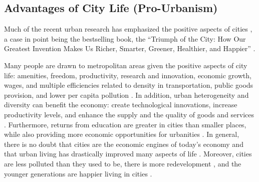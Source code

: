 \documentclass[11pt, letterpaper]{article}
\begin{document}
\begin{spacing}{1.4}
\subsection*{Advantages of City Life (Pro-Urbanism)}    
    
Much of the recent urban research has emphasized the positive aspects of cities \citep{thrift05,amin06,aokCityBook15,peck16}, a case in point being the bestselling book, the ``Triumph of the City: How Our Greatest Invention Makes Us Richer, Smarter, Greener, Healthier,
and Happier'' \citep{glaeser11}.

 
 Many people  are drawn to metropolitan areas  given the positive aspects of city life: amenities, freedom, productivity, research and innovation, economic growth, wages, and multiple efficiencies related to
density in transportation, public goods provision, and lower per capita pollution \citep{tonnies57,osullivan09,meyer13,rosenthal02,bettencourt10}.
In addition, urban heterogeneity and diversity can benefit the economy: create technological
innovations, increase productivity levels, and enhance the supply and the
quality of goods and services \citep{rodriguez2019does}.
Furthermore, returns from education are greater in cities than smaller places, while also
providing more economic opportunities for urbanities \citep{florida13}. 
 In general, there is no doubt that cities are the economic engines of today's
 economy \citep[e.g.,][]{osullivan09} and that urban living has drastically improved many aspects of life \citep[e.g.,][]{glaeser11}. Moreover, cities are less polluted than they used to be, there is more redevelopment
 \citep[e.g.,][]{glaeser11}, and the younger generations are happier living in cities \citep{aok-swbGenYcity18}.


\end{spacing}
\end{document}
